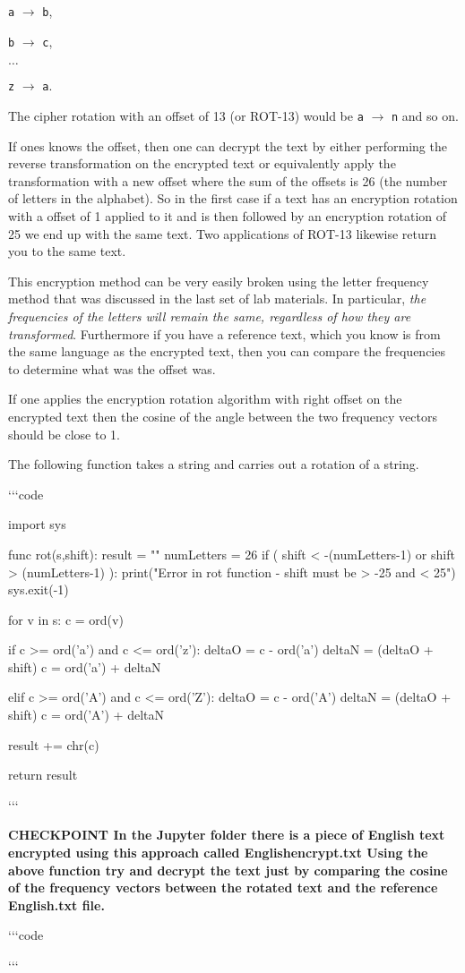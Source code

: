 \documentclass[11pt]{amsart}
\newcommand{\cli}[1]{`{}`{}`{}code
#1 
`{}`{}`{}}
\newcommand{\checkpoint}[1]{{\bf CHECKPOINT \newline #1 \newline} 

`{}`{}`{}code
 
`{}`{}`{}
}
\begin{document}
{\tt a} $\rightarrow$ {\tt b},

{\tt b} $\rightarrow$ {\tt c},

$\dots$

{\tt z} $\rightarrow$ {\tt a}.

The cipher rotation with an offset of  13 (or ROT-13) would be  {\tt a} $\rightarrow$ {\tt n} and so on.

If ones knows the offset, then one can decrypt the text by either performing the reverse transformation
on the encrypted text or equivalently apply the transformation with a new offset where the sum of the
offsets is 26 (the number of letters in the alphabet). So in the first case if a text has an encryption
rotation with a offset of 1  applied to it and is then followed by an encryption rotation of 25 we end up with the same text. Two applications of ROT-13 likewise return you to the same text.

This encryption method can be very easily broken using the letter frequency method that was discussed in the last set of lab materials. In particular, {\it the frequencies of the letters will remain the same, regardless of how they are transformed}. Furthermore if you have a reference text, which you know is from the same language as the encrypted text, then you can compare the frequencies to determine what was the offset was.

If one applies the encryption rotation algorithm with right offset on the encrypted
text then the cosine of the angle between the two frequency vectors should be close to 1.

The following function takes a string and carries out a rotation of a 
string. 

\cli{
import sys

func rot(s,shift):
    result = ""
    numLetters = 26
    if ( shift < -(numLetters-1) or shift > (numLetters-1) ):
        print("Error in rot function - shift must be > -25 and < 25")
        sys.exit(-1)
        
    for v in s:
        c = ord(v)

        if c >= ord('a') and c <= ord('z'):
            deltaO = c - ord('a')
            deltaN = (deltaO + shift) %
            c = ord('a') + deltaN
            
        elif c >= ord('A') and c <= ord('Z'):
            deltaO = c - ord('A')
            deltaN = (deltaO + shift) %
            c = ord('A') + deltaN

        result += chr(c)

    return result

}

\checkpoint{In the Jupyter folder there is a piece of English text encrypted using this approach called Englishencrypt.txt Using the above function try and decrypt the text just by comparing the cosine
of the frequency vectors between the rotated text and the reference English.txt file. }
 
\end{document}
